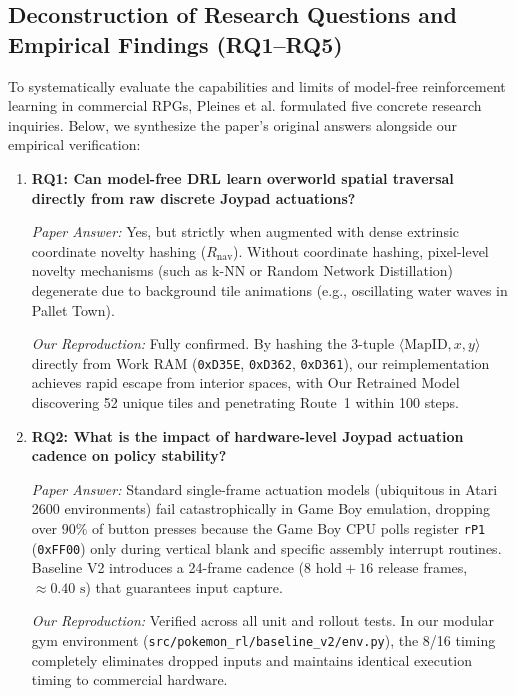 \documentclass[conference]{IEEEtran}
\begin{document}
\subsection{Deconstruction of Research Questions and Empirical Findings (RQ1--RQ5)}
To systematically evaluate the capabilities and limits of model-free reinforcement learning in commercial RPGs, Pleines et al. formulated five concrete research inquiries. Below, we synthesize the paper's original answers alongside our empirical verification:

\begin{enumerate}
    \item \textbf{RQ1: Can model-free DRL learn overworld spatial traversal directly from raw discrete Joypad actuations?}

    \textit{Paper Answer:} Yes, but strictly when augmented with dense extrinsic coordinate novelty hashing ($R_{\text{nav}}$). Without coordinate hashing, pixel-level novelty mechanisms (such as k-NN or Random Network Distillation) degenerate due to background tile animations (e.g., oscillating water waves in Pallet Town).

    \textit{Our Reproduction:} Fully confirmed. By hashing the 3-tuple $\langle \text{MapID}, x, y \rangle$ directly from Work RAM (\texttt{0xD35E}, \texttt{0xD362}, \texttt{0xD361}), our reimplementation achieves rapid escape from interior spaces, with Our Retrained Model discovering 52 unique tiles and penetrating Route~1 within 100 steps.

    \item \textbf{RQ2: What is the impact of hardware-level Joypad actuation cadence on policy stability?}

    \textit{Paper Answer:} Standard single-frame actuation models (ubiquitous in Atari 2600 environments) fail catastrophically in Game Boy emulation, dropping over $90\%$ of button presses because the Game Boy CPU polls register \texttt{rP1} (\texttt{0xFF00}) only during vertical blank and specific assembly interrupt routines. Baseline V2 introduces a 24-frame cadence ($8\text{ hold} + 16\text{ release}$ frames, $\approx 0.40\text{ s}$) that guarantees input capture.

    \textit{Our Reproduction:} Verified across all unit and rollout tests. In our modular gym environment (\texttt{src/}\allowbreak\texttt{pokemon\_rl/}\allowbreak\texttt{baseline\_v2/}\allowbreak\texttt{env.py}), the 8/16 timing completely eliminates dropped inputs and maintains identical execution timing to commercial hardware.


\end{enumerate}
\end{document}
